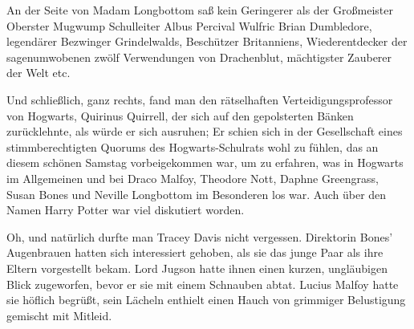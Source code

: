An der Seite von Madam Longbottom saß kein Geringerer als der Großmeister Oberster Mugwump Schulleiter Albus Percival Wulfric Brian Dumbledore, legendärer Bezwinger Grindelwalds, Beschützer Britanniens, Wiederentdecker der sagenumwobenen zwölf Verwendungen von Drachenblut, mächtigster Zauberer der Welt etc.

Und schließlich, ganz rechts, fand man den rätselhaften Verteidigungsprofessor von Hogwarts, Quirinus Quirrell, der sich auf den gepolsterten Bänken zurücklehnte, als würde er sich ausruhen; Er schien sich in der Gesellschaft eines stimmberechtigten Quorums des Hogwarts-Schulrats wohl zu fühlen, das an diesem schönen Samstag vorbeigekommen war, um zu erfahren, was in Hogwarts im Allgemeinen und bei Draco Malfoy, Theodore Nott, Daphne Greengrass, Susan Bones und Neville Longbottom im Besonderen los war. Auch über den Namen Harry Potter war viel diskutiert worden.

Oh, und natürlich durfte man Tracey Davis nicht vergessen. Direktorin Bones’ Augenbrauen hatten sich interessiert gehoben, als sie das junge Paar als ihre Eltern vorgestellt bekam. Lord Jugson hatte ihnen einen kurzen, ungläubigen Blick zugeworfen, bevor er sie mit einem Schnauben abtat. Lucius Malfoy hatte sie höflich begrüßt, sein Lächeln enthielt einen Hauch von grimmiger Belustigung gemischt mit Mitleid.

